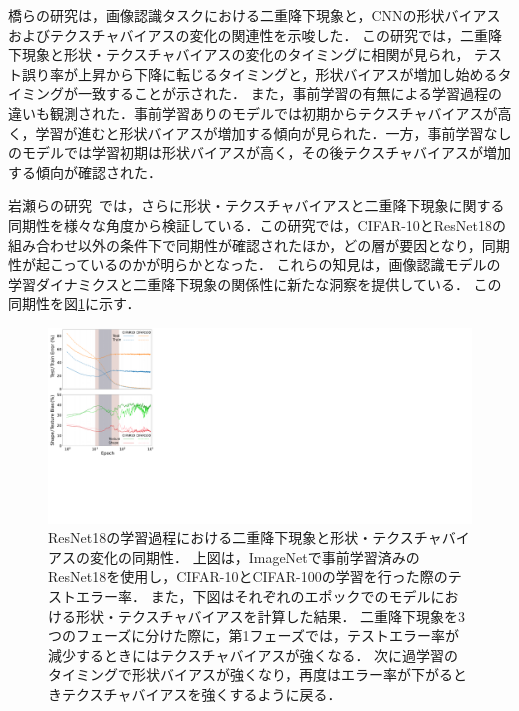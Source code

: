 橋らの研究\cite{DD_STB}は，画像認識タスクにおける二重降下現象と，CNNの形状バイアスおよびテクスチャバイアスの変化の関連性を示唆した．
この研究では，二重降下現象と形状・テクスチャバイアスの変化のタイミングに相関が見られ，
テスト誤り率が上昇から下降に転じるタイミングと，形状バイアスが増加し始めるタイミングが一致することが示された．
また，事前学習の有無による学習過程の違いも観測された．事前学習ありのモデルでは初期からテクスチャバイアスが高く，学習が進むと形状バイアスが増加する傾向が見られた．一方，事前学習なしのモデルでは学習初期は形状バイアスが高く，その後テクスチャバイアスが増加する傾向が確認された．

岩瀬らの研究~\cite{icpr2024iwase}では，さらに形状・テクスチャバイアスと二重降下現象に関する同期性を様々な角度から検証している．この研究では，CIFAR-10とResNet18の組み合わせ以外の条件下で同期性が確認されたほか，どの層が要因となり，同期性が起こっているのかが明らかとなった．
これらの知見は，画像認識モデルの学習ダイナミクスと二重降下現象の関係性に新たな洞察を提供している．
この同期性を図\ref{fig:iwaseICPR}に示す．

\begin{figure}[H]
    \centering
    \includegraphics[width=\linewidth]{fig/iwaseICPR.pdf}
    \caption[ResNet18の学習過程における二重降下現象と形状・テクスチャバイアスの変化の同期性]{ResNet18の学習過程における二重降下現象と形状・テクスチャバイアスの変化の同期性．
    上図は，ImageNetで事前学習済みのResNet18を使用し，CIFAR-10とCIFAR-100の学習を行った際のテストエラー率．
    また，下図はそれぞれのエポックでのモデルにおける形状・テクスチャバイアスを計算した結果．
    二重降下現象を3つのフェーズに分けた際に，第1フェーズでは，テストエラー率が減少するときにはテクスチャバイアスが強くなる．
    次に過学習のタイミングで形状バイアスが強くなり，再度はエラー率が下がるときテクスチャバイアスを強くするように戻る．}
    \label{fig:iwaseICPR}
\end{figure}

